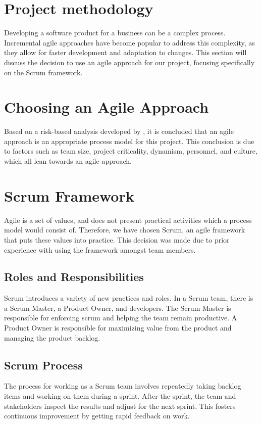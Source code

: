 
\section{Project methodology}
Developing a software product for a business can be a complex process. Incremental agile approaches have become popular to address this complexity, as they allow for faster development and adaptation to changes. This section will discuss the decision to use an agile approach for our project, focusing specifically on the Scrum framework.

\section{Choosing an Agile Approach}
Based on a risk-based analysis developed by , it is concluded that an agile approach is an appropriate process model for this project. This conclusion is due to factors such as team size, project criticality, dynamism, personnel, and culture, which all lean towards an agile approach\cite{boehmObservationsBalancingDiscipline}.

\section{Scrum Framework}
Agile is a set of values, and does not present practical activities which a process model would consist of\cite{sutherlandScrumArtDoing2014}. Therefore, we have chosen Scrum\cite{scrumdotorg}, an agile framework that puts these values into practice. This decision was made due to prior experience with using the framework amongst team members.

\subsection{Roles and Responsibilities}
Scrum introduces a variety of new practices and roles. In a Scrum team, there is a Scrum Master, a Product Owner, and developers. The Scrum Master is responsible for enforcing scrum and helping the team remain productive. A Product Owner is responsible for maximizing value from the product and managing the product backlog.

\subsection{Scrum Process}
The process for working as a Scrum team involves repeatedly taking backlog items and working on them during a sprint. After the sprint, the team and stakeholders inspect the results and adjust for the next sprint. This fosters continuous improvement by getting rapid feedback on work.

